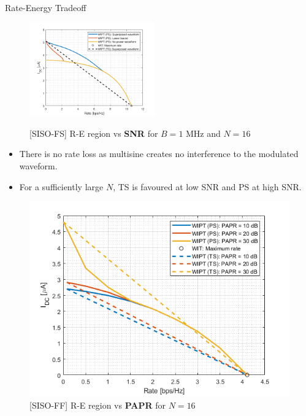 \documentclass[xcolor={table}]{beamer}
\begin{document}
\begin{frame}[fragile=singleslide,t]
\begin{columns}[onlytextwidth,T]
\begin{column}{.47\textwidth}
\begin{block}{Rate-Energy Tradeoff}
\begin{figure}
{    \includegraphics[width=0.48\textwidth]{re_fs_snr_40dB}}
  \caption{[SISO-FS] R-E region vs \textbf{SNR} for $B = 1$ MHz and $N = 16$ }\label{fig:snr}
\end{figure}
\begin{itemize}
  \item There is no rate loss as multisine creates no interference to the modulated waveform.
  \item For a sufficiently large $N$, TS is favoured at low SNR and PS at high SNR.
\end{itemize}
\begin{figure}
\centering
\begin{minipage}[t]{0.48\textwidth}
\centering
\includegraphics[width=\textwidth]{re_ff_papr}
\caption{[SISO-FF] R-E region vs \textbf{PAPR} for $N = 16$}\label{fig:papr}
\end{minipage}
\begin{minipage}[t]{0.48\textwidth}
\centering

\end{minipage}
\end{figure}
\end{block}
\end{column}
\end{columns}
\end{frame}
\end{document}
